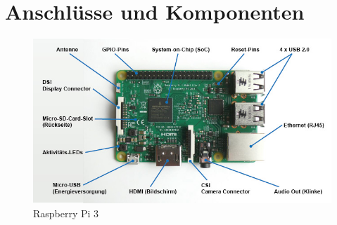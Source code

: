 \documentclass[12pt,a4paper]{article}
\begin{document}

\clearpage
\appendix
\makeatletter
\def\@seccntformat#1{Anhang~\csname the#1\endcsname:\quad}
\makeatother

\section{Anschlüsse und Komponenten}
\label{apx:comp}

\begin{figure}[h]
\centering
\includegraphics[scale=0.7]{raspberry_loesung}
\caption{Raspberry Pi 3}
\label{fig:rp_ls}
\end{figure}
\end{document}
